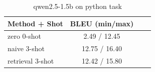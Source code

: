 \begin{table}[ht]
\centering
\small
\caption{qwen2.5-1.5b on python task}
\begin{tabular}{lccc}
\hline
Method + Shot & BLEU (min/max) \\
\hline
zero 0-shot & 2.49 / 12.45 \\
naive 3-shot & 12.75 / 16.40 \\
retrieval 3-shot & 12.42 / 15.80 \\
\hline
\end{tabular}
\end{table}
